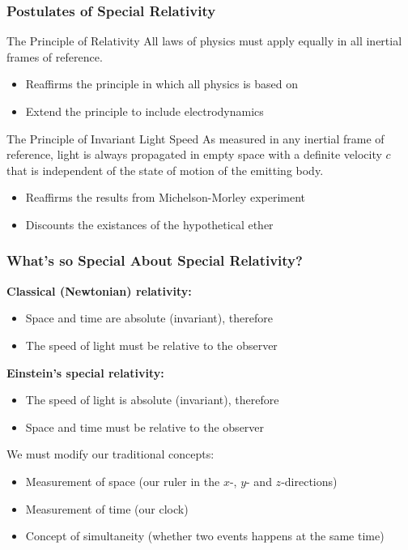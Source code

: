 \documentclass[12pt,compress,aspectratio=169]{beamer}
\begin{document}
\begin{frame}
  \frametitle{Postulates of Special Relativity}
  \begin{block}{The Principle of Relativity}
    All laws of physics must apply equally in all inertial frames of reference.
  \end{block}
  \begin{itemize}
  \item Reaffirms the principle in which all physics is based on
  \item Extend the principle to include electrodynamics
  \end{itemize}

  \vspace{.1in}
  \begin{block}{The Principle of Invariant Light Speed}
    As measured in any inertial frame of reference, light is always propagated
    in empty space with a definite velocity $c$ that is independent of the
    state of motion of the emitting body.
  \end{block}
  \begin{itemize}
  \item Reaffirms the results from Michelson-Morley experiment
  \item Discounts the existances of the  hypothetical ether
  \end{itemize}
\end{frame}

\begin{frame}
  \frametitle{What's so Special About Special Relativity?}

  \textbf{Classical (Newtonian) relativity:}
  \begin{itemize}
  \item Space and time are absolute (invariant), therefore
  \item The speed of light must be relative to the observer
  \end{itemize}

  \textbf{Einstein's special relativity:}
  \begin{itemize}
  \item The speed of light is absolute (invariant), therefore
  \item Space and time must be relative to the observer
  \end{itemize}

  We must modify our traditional concepts:
  \begin{itemize}
  \item Measurement of space (our ruler in the $x$-, $y$- and $z$-directions)
  \item Measurement of time (our clock)
  \item Concept of simultaneity (whether two events happens at the same time)
  \end{itemize}
\end{frame}
\end{document}

